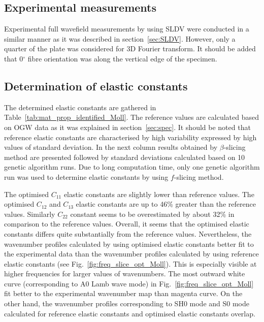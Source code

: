\documentclass[preprint,12pt]{elsarticle}
\begin{document}
\subsection{Experimental measurements}
Experimental full wavefield measurements by using SLDV were conducted in a similar manner as it was described in section~\ref{sec:SLDV}. 
However, only a quarter of the plate was considered for 3D Fourier transform.
It should be added that 0\(^{\circ}\) fibre orientation was along the vertical edge of the specimen.
\subsection{Determination of elastic constants}
The determined elastic constants are gathered in Table~\ref{tab:mat_prop_identified_Moll}.
The reference values are calculated based on OGW data as it was explained in section~\ref{sec:spec}.
It should be noted that reference elastic constants are characterised by high variability expressed by high values of standard deviation.
In the next column results obtained by $\beta$-slicing method are presented followed by standard deviations calculated based on 10 genetic algorithm runs.
Due to long computation time, only one genetic algorithm run was used to determine elastic constants by using $f$-slicing method.

The optimised $C_{11}$ elastic constants are slightly lower than reference values.
The optimised $C_{12}$ and $C_{13}$ elastic constants are up to 46\% greater than the reference values.
Similarly $C_{22}$ constant seems to be overestimated by about 32\% in comparison to the reference values.
Overall, it seems that the optimised elastic constants differs quite substantially from the reference values.
Nevertheless, the wavenumber profiles calculated by using optimised elastic constants better fit to the experimental data than the wavenumber profiles calculated by using reference elastic constants (see Fig.~\ref{fig:freq_slice_opt_Moll}).
This is especially visible at higher frequencies for larger values of wavenumbers.
The most outward white curve (corresponding to A0 Lamb wave mode) in Fig.~\ref{fig:freq_slice_opt_Moll} fit better to the experimental wavenumber map than magenta curve.
On the other hand, the wavenumber profiles corresponding to SH0 mode and S0 mode calculated for reference elastic constants and optimised elastic constants overlap.
\end{document}

